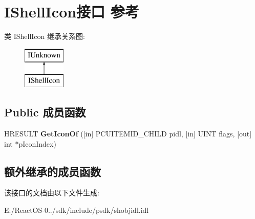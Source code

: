 \hypertarget{interface_i_shell_icon}{}\section{I\+Shell\+Icon接口 参考}
\label{interface_i_shell_icon}
类 I\+Shell\+Icon 继承关系图\+:\begin{figure}[H]
\begin{center}
\leavevmode
\includegraphics[height=2.000000cm]{interface_i_shell_icon}
\end{center}
\end{figure}
\subsection*{Public 成员函数}
\begin{DoxyCompactItemize}
\item 
\mbox{\label{interface_i_shell_icon_a4571f7c92f1a6ab4e14e25019a1acc83}} 
H\+R\+E\+S\+U\+LT {\bfseries Get\+Icon\+Of} (\mbox{[}in\mbox{]} P\+C\+U\+I\+T\+E\+M\+I\+D\+\_\+\+C\+H\+I\+LD pidl, \mbox{[}in\mbox{]} U\+I\+NT flags, \mbox{[}out\mbox{]} int $\ast$p\+Icon\+Index)
\end{DoxyCompactItemize}
\subsection*{额外继承的成员函数}


该接口的文档由以下文件生成\+:\begin{DoxyCompactItemize}
\item 
E\+:/\+React\+O\+S-\/0../sdk/include/psdk/shobjidl.\+idl\end{DoxyCompactItemize}
